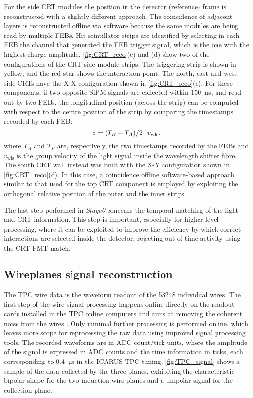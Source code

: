 For the side CRT modules the position in the detector (reference) frame is reconstructed with a slightly different approach. The coincidence of adjacent layers is reconstructed offline via software because the same modules are being read by multiple FEBs. Hit scintillator strips are identified by selecting in each FEB the channel that generated the FEB trigger signal, which is the one with the highest charge amplitude. \autoref{fig:CRT_reco}(c) and (d) show two of the configurations of the CRT side module strips. The triggering strip is shown in yellow, and the red star shows the interaction point. The north, east and west side CRTs have the X-X configuration shown in \autoref{fig:CRT_reco}(c). For these components, if two opposite SiPM signals are collected within \SI{150}{\ns}, and read out by two FEBs, the longitudinal position (across the strip) can be computed with respect to the centre position of the strip by comparing the timestamps recorded by each FEB:     \begin{equation}
    z = \qty(T_B - T_A)/2 \cdot v_\mathrm{wls}, 
\end{equation} where $T_A$ and $T_B$ are, respectively, the two timestamps recorded by the FEBs  and $v_\mathrm{wls}$ is the group velocity of the light signal inside the wavelength shifter fibre. The south CRT wall instead was built with the X-Y configuration shown in \autoref{fig:CRT_reco}(d). In this case, a coincidence offline software-based approach similar to that used for the top CRT component is employed by exploiting the orthogonal relative position of the outer and the inner strips. 

The last step performed in \emph{Stage0} concerns the temporal matching of the light and CRT information. This step is important, especially for higher-level processing, where it can be exploited to improve the efficiency by which correct interactions are selected inside the detector, rejecting out-of-time activity using the CRT-PMT match. 

\subsection{Wireplanes signal reconstruction} \label{sec:TPCSignalReconstruction}

The TPC wire data is the waveform readout of the \num{53248} individual wires. The first step of the wire signal processing happens online directly on the readout cards installed in the TPC online computers and aims at removing the coherent noise from the wires \cite{MicroBooNE:2017qiu}. Only minimal further processing is performed online, which leaves more scope for reprocessing the raw data using improved signal processing tools. The recorded waveforms are in ADC count/tick units, where the amplitude of the signal is expressed in ADC counts and the time information in ticks, each corresponding to \SI{0.4}{\us} in the ICARUS TPC timing. \autoref{fig:TPC_signal} shows a sample of the data collected by the three planes, exhibiting the characteristic bipolar shape for the two induction wire planes and a unipolar signal for the collection plane. 

